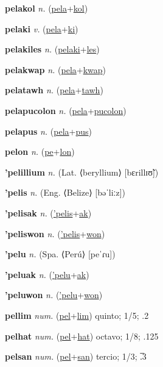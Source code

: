 \textbf{\hypertarget{pelakol}{pelakol}} \textit{n.} (\hyperlink{pela}{pela}+\allowbreak \hyperlink{kol}{kol})


\textbf{\hypertarget{pelaki}{pelaki}} \textit{v.} (\hyperlink{pela}{pela}+\allowbreak \hyperlink{ki}{ki})


\textbf{\hypertarget{pelakiles}{pelakiles}} \textit{n.} (\hyperlink{pelaki}{pelaki}+\allowbreak \hyperlink{les}{les})


\textbf{\hypertarget{pelakwap}{pelakwap}} \textit{n.} (\hyperlink{pela}{pela}+\allowbreak \hyperlink{kwap}{kwap})


\textbf{\hypertarget{pelatawh}{pelatawh}} \textit{n.} (\hyperlink{pela}{pela}+\allowbreak \hyperlink{tawh}{tawh})


\textbf{\hypertarget{pelapucolon}{pelapucolon}} \textit{n.} (\hyperlink{pela}{pela}+\allowbreak \hyperlink{pucolon}{pucolon})


\textbf{\hypertarget{pelapus}{pelapus}} \textit{n.} (\hyperlink{pela}{pela}+\allowbreak \hyperlink{pus}{pus})


\textbf{\hypertarget{pelon}{pelon}} \textit{n.} (\hyperlink{pe}{pe}+\allowbreak \hyperlink{lon}{lon})


\textbf{\hypertarget{'pelillium}{'pelillium}} \textit{n.} (Lat. ⟨beryllium⟩ [bɛrillɪʊ̃])


\textbf{\hypertarget{'pelis}{'pelis}} \textit{n.} (Eng. ⟨Belize⟩ [bəˈliːz])


\textbf{\hypertarget{'pelisak}{'pelisak}} \textit{n.} (\hyperlink{'pelis}{'pelis}+\allowbreak \hyperlink{ak}{ak})


\textbf{\hypertarget{'peliswon}{'peliswon}} \textit{n.} (\hyperlink{'pelis}{'pelis}+\allowbreak \hyperlink{won}{won})


\textbf{\hypertarget{'pelu}{'pelu}} \textit{n.} (Spa. ⟨Perú⟩ [peˈɾu])


\textbf{\hypertarget{'peluak}{'peluak}} \textit{n.} (\hyperlink{'pelu}{'pelu}+\allowbreak \hyperlink{ak}{ak})


\textbf{\hypertarget{'peluwon}{'peluwon}} \textit{n.} (\hyperlink{'pelu}{'pelu}+\allowbreak \hyperlink{won}{won})


\textbf{\hypertarget{pellim}{pellim}} \textit{num.} (\hyperlink{pel}{pel}+\allowbreak \hyperlink{lim}{lim})
quinto; 1/5; .2

\textbf{\hypertarget{pelhat}{pelhat}} \textit{num.} (\hyperlink{pel}{pel}+\allowbreak \hyperlink{hat}{hat})
octavo; 1/8; .125

\textbf{\hypertarget{pelsan}{pelsan}} \textit{num.} (\hyperlink{pel}{pel}+\allowbreak \hyperlink{san}{san})
tercio; 1/3; .̅3

